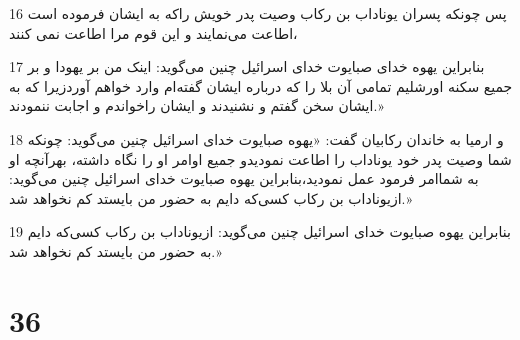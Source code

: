 \par 16 پس چونکه پسران یوناداب بن رکاب وصیت پدر خویش راکه به ایشان فرموده است اطاعت می‌نمایند و این قوم مرا اطاعت نمی کنند،
\par 17 بنابراین یهوه خدای صبایوت خدای اسرائیل چنین می‌گوید: اینک من بر یهودا و بر جمیع سکنه اورشلیم تمامی آن بلا را که درباره ایشان گفته‌ام وارد خواهم آوردزیرا که به ایشان سخن گفتم و نشنیدند و ایشان راخواندم و اجابت ننمودند.»
\par 18 و ارمیا به خاندان رکابیان گفت: «یهوه صبایوت خدای اسرائیل چنین می‌گوید: چونکه شما وصیت پدر خود یوناداب را اطاعت نمودیدو جمیع اوامر او را نگاه داشته، بهر‌آنچه او به شماامر فرمود عمل نمودید،بنابراین یهوه صبایوت خدای اسرائیل چنین می‌گوید: ازیوناداب بن رکاب کسی‌که دایم به حضور من بایستد کم نخواهد شد.»
\par 19 بنابراین یهوه صبایوت خدای اسرائیل چنین می‌گوید: ازیوناداب بن رکاب کسی‌که دایم به حضور من بایستد کم نخواهد شد.»
 
\chapter{36}

